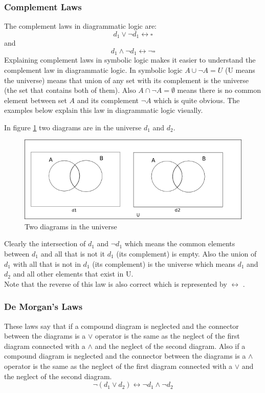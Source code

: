 \documentclass[a4paper]{article}
\begin{document}
\subsubsection{Complement Laws} 
The complement laws in diagrammatic logic are:
$$ d_{1} \vee \neg d_{1} \longleftrightarrow \square $$
and
$$ d_{1} \wedge \neg d_{1} \longleftrightarrow \neg \square $$
Explaining complement laws in symbolic logic makes it easier to understand the complement law in diagrammatic logic. In symbolic logic $A \cup \neg A = U $ (U means the universe) means that union of any set with its complement is the universe (the set that contains both of them). Also $A \cap \neg A = \emptyset $ means there is no common element between set $A$ and its complement $\neg A$ which is quite obvious. The examples below explain this law in diagrammatic logic visually.
 
In figure \ref{d7} two diagrams are in the universe $d_{1}$ and $d_{2}$.

\begin{figure}[h]
\centering
\includegraphics[scale=0.7]{images/d7.png}
\caption{Two diagrams in the universe}
\label{d7}
\end{figure}

Clearly the intersection of $d_{1}$ and $\neg d_{1}$ which means the common elements between $d_{1}$ and all that is not it $d_{1}$ (its complement) is empty. Also the union of $d_{1}$ with all that is not in $d_{1}$ (its complement) is the universe which means $d_{1}$ and $d_{2}$ and all other elements that exist in U.\\
Note that the reverse of this law is also correct which is represented by $\longleftrightarrow$ .

\subsubsection{De Morgan's Laws}
These laws say that if a compound diagram is neglected and the connector between the diagrams is a $\vee$ operator is the same as the neglect of the first diagram connected with a $\wedge$ and the neglect of the second diagram. Also if a compound diagram is neglected and the connector between the diagrams is a $\wedge$ operator is the same as the neglect of the first diagram connected with a $\vee$ and the neglect of the second diagram.
$$ \neg(d_{1} \vee d_{2}) \longleftrightarrow \neg d_{1} \wedge \neg d_{2} $$
\end{document}
